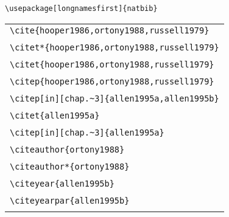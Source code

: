\documentclass{article}
\begin{document}
\verb#\usepackage[longnamesfirst]{natbib}#\\

\begin{center}
\begin{tabular}{l}
\verb#\cite{hooper1986,ortony1988,russell1979}# \\
\cite{hooper1986,ortony1988,russell1979}  \\\hline 
\verb#\citet*{hooper1986,ortony1988,russell1979}# \\
 \citet*{hooper1986,ortony1988,russell1979}  \\\hline
\verb#\citet{hooper1986,ortony1988,russell1979}# \\
 \citet{hooper1986,ortony1988,russell1979}  \\\hline
\verb#\citep{hooper1986,ortony1988,russell1979}# \\
 \citep{hooper1986,ortony1988,russell1979}  \\\hline
[Fails in 1.9.15] \verb#\citep[in][chap.~3]{allen1995a,allen1995b}# \\
 \citep[in][chap.~3]{allen1995a,allen1995b} \\\hline
\verb#\citet{allen1995a}# \\
 \citet{allen1995a} \\\hline
\verb#\citep[in][chap.~3]{allen1995a}# \\
 \citep[in][chap.~3]{allen1995a} \\\hline
\verb#\citeauthor{ortony1988}# \\
 \citeauthor{ortony1988} \\\hline
\verb#\citeauthor*{ortony1988}# \\
 \citeauthor*{ortony1988} \\\hline
\verb#\citeyear{allen1995b}# \\
 \citeyear{allen1995b} \\\hline
\verb#\citeyearpar{allen1995b}# \\
 \citeyearpar{allen1995b} \\\hline
\end{tabular}
\end{center}
\end{document}
